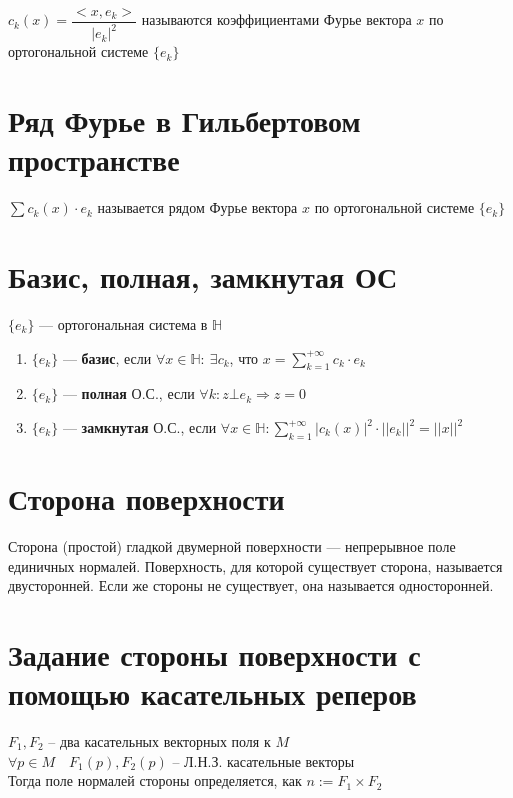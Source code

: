 \documentclass[paper=a4, fontsize=17pt]{article}
\begin{document}
	$c_k(x) = \dfrac{<x, e_k>}{|e_k|^2}$ называются коэффициентами Фурье вектора $x$ по ортогональной системе $\{e_k\}$
	
	\section{Ряд Фурье в Гильбертовом пространстве}
	
	$\sum c_k(x) \cdot e_k$ называется рядом Фурье вектора $x$ по ортогональной системе $\{e_k\}$
	
	\section{Базис, полная, замкнутая ОС}
	
	$\{e_k\}$ {{---}} ортогональная система в $\mathds{H}$
	
	\begin{enumerate}
		
		\item $\{e_k\}$ {{---}} \textbf{базис}, если $\forall x \in \mathds{H}:\ \exists c_k$, что $x = \sum\limits_{k=1}^{+\infty} c_k \cdot e_k$
		
		\item $\{e_k\}$ {{---}} \textbf{полная} О.С., если $\forall k: z \bot e_k \Rightarrow z = 0$
		
		\item $\{e_k\}$ {{---}} \textbf{замкнутая} О.С., если $\forall x \in \mathds{H}: \sum\limits_{k=1}^{+\infty} |c_k(x)|^2 \cdot ||e_k||^2 = ||x||^2$
		
	\end{enumerate}
	
	\section{Сторона поверхности}
	
	Сторона (простой) гладкой двумерной поверхности {{---}} непрерывное поле единичных нормалей. Поверхность, для которой существует сторона, называется двусторонней. Если же стороны не существует, она называется односторонней.
	
	
	\section{Задание стороны поверхности с помощью касательных реперов}
	
	$F_1, F_2$ -- два касательных векторных поля к $M$\\
	$\forall p \in M \quad F_1(p), F_2(p)$ -- Л.Н.З. касательные векторы\\
	Тогда поле нормалей стороны определяется, как $n := F_1 \times F_2$\\
	
\end{document}

